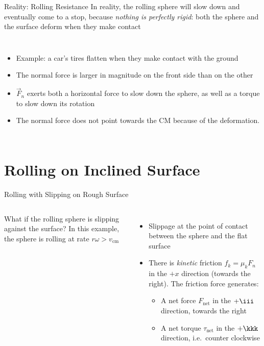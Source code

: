 \documentclass[12pt,compress,aspectratio=169]{beamer}
\begin{document}
\begin{frame}{Reality: Rolling Resistance}
  In reality, the rolling sphere will slow down and eventually come to a stop,
  because \emph{nothing is perfectly rigid}: both the sphere and the surface
  deform when they make contact
  \begin{columns}
    \begin{itemize}
    \item Example: a car's tires flatten when they make contact with the ground
    \item The normal force is larger in magnitude on the front side than on the
      other
    \item $\vec F_n$ exerts both a horizontal force to slow down the sphere, as
      well as a torque to slow down its rotation
    \item The normal force does not point towards the CM because of the
      deformation.
    \end{itemize}

    \vspace{.3in}
  \end{columns}
\end{frame}




\section{Rolling on Inclined Surface}


\begin{frame}{Rolling with Slipping on Rough Surface}
  \begin{columns}
    

    What if the rolling sphere is slipping against the surface? In this
    example, the sphere is rolling at rate $r\omega>v_\text{cm}$
    \begin{itemize}
    \item Slippage at the point of contact between the sphere and the flat
      surface
    \item There is \emph{kinetic} friction $f_k=\mu_kF_n$ in the $+x$
      direction (towards the right). The friction force generates:
      \begin{itemize}
      \item A net force $F_\text{net}$ in the $+\iii$ direction, towards the
        right
      \item A net torque $\tau_\text{net}$ in the $+\kkk$ direction, i.e.\
        counter clockwise
      \end{itemize}
    \end{itemize}
  \end{columns}
\end{frame}
\end{document}
